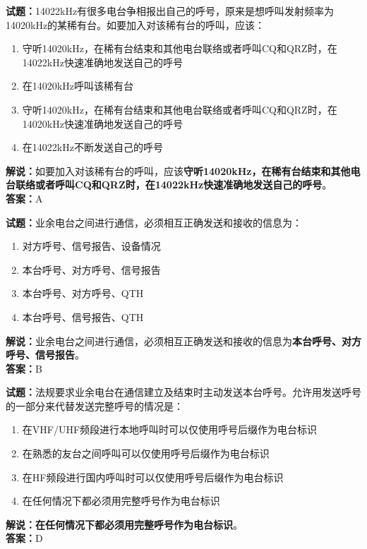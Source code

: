 \documentclass{ctexbook}
\begin{document}
\vspace{1em}

\textbf{试题：}14022\si{\kHz}有很多电台争相报出自己的呼号，原来是想呼叫发射频率为14020\si{\kHz}的某稀有台。如要加入对该稀有台的呼叫，应该：
\begin{enumerate}[leftmargin=3em]
  \item 守听14020\si{\kHz}，在稀有台结束和其他电台联络或者呼叫CQ和QRZ时，在14022\si{\kHz}快速准确地发送自己的呼号
  \item 在14020\si{\kHz}呼叫该稀有台
  \item 守听14020\si{\kHz}，在稀有台结束和其他电台联络或者呼叫CQ和QRZ时，在14020\si{\kHz}快速准确地发送自己的呼号
  \item 在14022\si{\kHz}不断发送自己的呼号
\end{enumerate}
\noindent\textbf{解说：}如要加入对该稀有台的呼叫，应该\textbf{守听14020\si{\kHz}，在稀有台结束和其他电台联络或者呼叫CQ和QRZ时，在14022\si{\kHz}快速准确地发送自己的呼号}。\\\noindent\textbf{答案：}A

\vspace{1em}

\textbf{试题：}业余电台之间进行通信，必须相互正确发送和接收的信息为：
\begin{enumerate}[leftmargin=3em]
  \item 对方呼号、信号报告、设备情况
  \item 本台呼号、对方呼号、信号报告
  \item 本台呼号、对方呼号、QTH
  \item 本台呼号、信号报告、QTH
\end{enumerate}
\noindent\textbf{解说：}业余电台之间进行通信，必须相互正确发送和接收的信息为\textbf{本台呼号、对方呼号、信号报告}。\\\noindent\textbf{答案：}B

\vspace{1em}

\textbf{试题：}法规要求业余电台在通信建立及结束时主动发送本台呼号。允许用发送呼号的一部分来代替发送完整呼号的情况是：
\begin{enumerate}[leftmargin=3em]
  \item 在VHF/UHF频段进行本地呼叫时可以仅使用呼号后缀作为电台标识
  \item 在熟悉的友台之间呼叫可以仅使用呼号后缀作为电台标识
  \item 在HF频段进行国内呼叫时可以仅使用呼号后缀作为电台标识
  \item 在任何情况下都必须用完整呼号作为电台标识
\end{enumerate}
\noindent\textbf{解说：}\textbf{在任何情况下都必须用完整呼号作为电台标识}。\\\noindent\textbf{答案：}D
\end{document}

